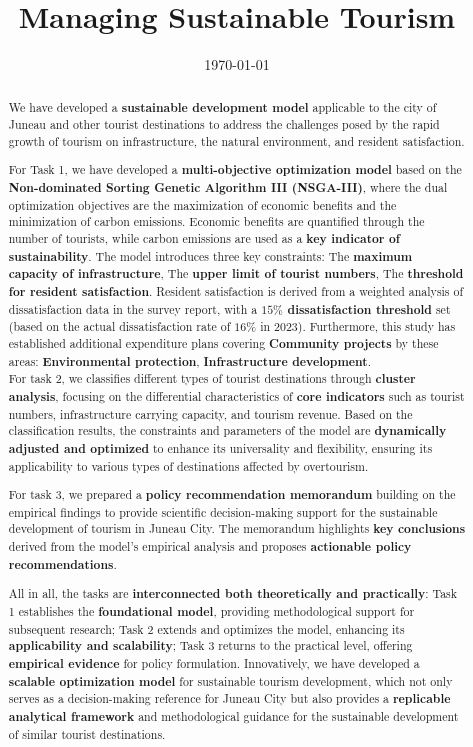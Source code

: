 \documentclass{mcmthesis}
\title{Managing Sustainable Tourism}
\date{\today}
\begin{document}
\begin{abstract}

  We have developed a \textbf{sustainable development model} applicable to the city of Juneau and 
other tourist destinations to address the challenges posed by the rapid growth of tourism
on infrastructure, the natural environment, and resident satisfaction.\par  
For Task 1, we have developed a \textbf{multi-objective optimization model} based on the 
\textbf{Non-dominated Sorting Genetic Algorithm III (NSGA-III)}, where the dual optimization 
objectives are the maximization of economic benefits and the minimization of carbon emissions. 
Economic benefits are quantified through the number of tourists, while carbon emissions 
are used as a \textbf{key indicator of sustainability}. The model introduces three key constraints:  
The \textbf{maximum capacity of infrastructure},
The \textbf{upper limit of tourist numbers},
The \textbf{threshold for resident satisfaction}.
Resident satisfaction is derived from a weighted analysis of dissatisfaction data in the 
survey report, with a \textbf{$15\%$ dissatisfaction threshold} set (based on the actual 
dissatisfaction rate of $16\%$ in 2023). Furthermore, this study has established additional 
expenditure plans covering \textbf{Community projects} by these areas:
\textbf{Environmental protection},
\textbf{Infrastructure development}. \\
For task 2, we classifies different types of tourist destinations through \textbf{cluster analysis}, 
focusing on the differential characteristics of \textbf{core indicators} such as tourist numbers, 
infrastructure carrying capacity, and tourism revenue. Based on the classification results, 
the constraints and parameters of the model are \textbf{dynamically adjusted and optimized} to enhance its 
universality and flexibility, ensuring its applicability to various types of destinations affected 
by overtourism.\par

For task 3, we prepared a \textbf{policy recommendation memorandum} building on the empirical findings to 
provide scientific decision-making support for the sustainable development of tourism in Juneau 
City. The memorandum highlights \textbf{key conclusions} derived from the model's empirical analysis and 
proposes \textbf{actionable policy recommendations}.\par

All in all, the tasks are \textbf{interconnected both theoretically and practically}: Task 1 establishes the \textbf{foundational 
model}, providing methodological support for subsequent research; Task 2 extends and optimizes the 
model, enhancing its \textbf{applicability and scalability}; Task 3 returns to the practical level, offering 
\textbf{empirical evidence} for policy formulation. Innovatively, we have developed a \textbf{scalable optimization 
model} for sustainable tourism development, which not only serves as a decision-making reference for 
Juneau City but also provides a \textbf{replicable analytical framework} and methodological guidance for the 
sustainable development of similar tourist destinations.


\end{abstract}
\end{document}

